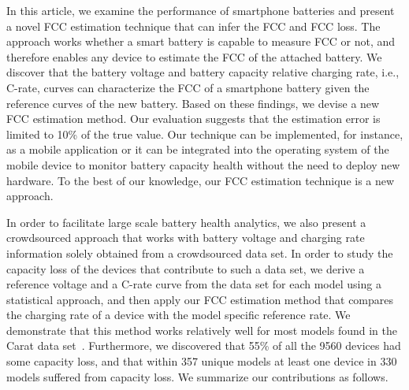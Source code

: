 \documentclass[journal]{IEEEtran}
\begin{document}
In this article, we examine the performance of smartphone batteries and present a novel FCC estimation technique that can infer the FCC and FCC loss. The approach works whether a smart battery is capable to measure FCC or not, and therefore enables any device to estimate the FCC of the attached battery. We discover that the battery voltage and battery capacity relative charging rate, i.e., C-rate, curves can characterize the FCC of a smartphone battery given the reference curves of the new battery. Based on these findings, we devise a new FCC estimation method.  Our evaluation suggests that the estimation error is limited to 10\% of the true value. Our technique can be implemented, for instance, as a mobile application or it can be integrated into the operating system of the mobile device to monitor battery capacity health without the need to deploy new hardware. To the best of our knowledge, our FCC estimation technique is a new approach. 


In order to facilitate large scale battery health analytics, we also present a crowdsourced approach that works with battery voltage and charging rate information solely obtained from a crowdsourced data set. In order to study the capacity loss of the devices that contribute to such a data set, we derive a reference voltage and a C-rate curve from the data set for each model using a statistical approach, and then apply our FCC estimation method that compares the charging rate of a device with the model specific reference rate. We demonstrate that this method works relatively well for most models found in the Carat data set~\cite{Oliner2013}. Furthermore, we discovered that 55\% of all the 9560 devices had some capacity loss, and that within 357 unique models at least one device in 330 models suffered from capacity loss. We summarize our contributions as follows.
\end{document}
